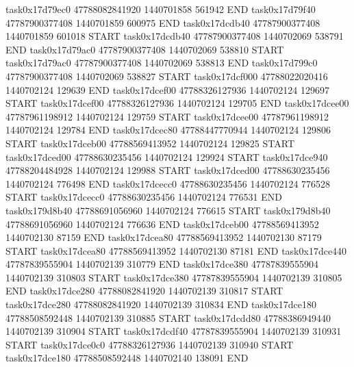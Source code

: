 task0x17d79ec0 47788082841920          1440701858               561942  END
task0x17d79f40 47787900377408          1440701859               600975  END
task0x17dcdb40 47787900377408          1440701859               601018  START
task0x17dcdb40 47787900377408          1440702069               538791  END
task0x17d79ac0 47787900377408          1440702069               538810  START
task0x17d79ac0 47787900377408          1440702069               538813  END
task0x17d799c0 47787900377408          1440702069               538827  START
task0x17dcf000 47788022020416          1440702124               129639  END
task0x17dcef00 47788326127936          1440702124               129697  START
task0x17dcef00 47788326127936          1440702124               129705  END
task0x17dcee00 47787961198912          1440702124               129759  START
task0x17dcee00 47787961198912          1440702124               129784  END
task0x17dcec80 47788447770944          1440702124               129806  START
task0x17dceb00 47788569413952          1440702124               129825  START
task0x17dced00 47788630235456          1440702124               129924  START
task0x17dce940 47788204484928          1440702124               129988  START
task0x17dced00 47788630235456          1440702124               776498  END
task0x17dcecc0 47788630235456          1440702124               776528  START
task0x17dcecc0 47788630235456          1440702124               776531  END
task0x179d8b40 47788691056960          1440702124               776615  START
task0x179d8b40 47788691056960          1440702124               776636  END
task0x17dceb00 47788569413952          1440702130                87159  END
task0x17dcea80 47788569413952          1440702130                87179  START
task0x17dcea80 47788569413952          1440702130                87181  END
task0x17dce440 47787839555904          1440702139               310779  END
task0x17dce380 47787839555904          1440702139               310803  START
task0x17dce380 47787839555904          1440702139               310805  END
task0x17dce280 47788082841920          1440702139               310817  START
task0x17dce280 47788082841920          1440702139               310834  END
task0x17dce180 47788508592448          1440702139               310885  START
task0x17dcdd80 47788386949440          1440702139               310904  START
task0x17dcdf40 47787839555904          1440702139               310931  START
task0x17dce0c0 47788326127936          1440702139               310940  START
task0x17dce180 47788508592448          1440702140               138091  END
